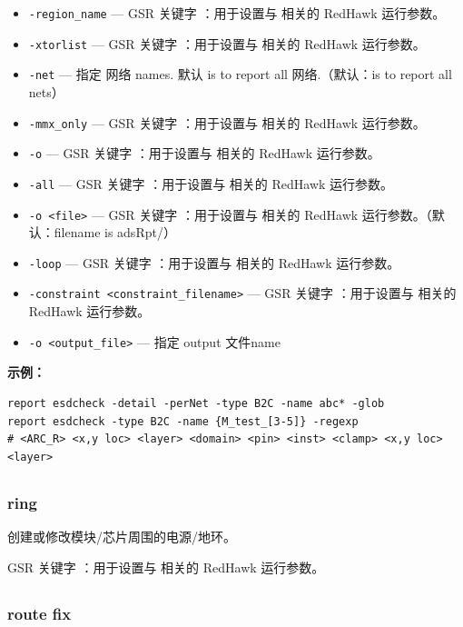 \begin{itemize}
\item \texttt{-region\_name} — GSR 关键字 ：用于设置与  相关的 RedHawk 运行参数。
\item \texttt{-xtorlist} — GSR 关键字 ：用于设置与  相关的 RedHawk 运行参数。
\item \texttt{-net} — 指定 网络 names. 默认 is to report all 网络.（默认：is to report all nets）
\item \texttt{-mmx\_only} — GSR 关键字 ：用于设置与  相关的 RedHawk 运行参数。
\item \texttt{-o} — GSR 关键字 ：用于设置与  相关的 RedHawk 运行参数。
\item \texttt{-all} — GSR 关键字 ：用于设置与  相关的 RedHawk 运行参数。
\item \texttt{-o <file>} — GSR 关键字 ：用于设置与  相关的 RedHawk 运行参数。（默认：filename is adsRpt/）
\item \texttt{-loop} — GSR 关键字 ：用于设置与  相关的 RedHawk 运行参数。
\item \texttt{-constraint <constraint\_filename>} — GSR 关键字 ：用于设置与  相关的 RedHawk 运行参数。
\item \texttt{-o <output\_file>} — 指定 output 文件name
\end{itemize}

\textbf{示例：}
\begin{lstlisting}
report esdcheck -detail -perNet -type B2C -name abc* -glob
report esdcheck -type B2C -name {M_test_[3-5]} -regexp
# <ARC_R> <x,y loc> <layer> <domain> <pin> <inst> <clamp> <x,y loc> <layer>
\end{lstlisting}

\subsection{}
\subsubsection*{ring}

创建或修改模块/芯片周围的电源/地环。

GSR 关键字 ：用于设置与  相关的 RedHawk 运行参数。

\subsection{}
\subsubsection*{route fix}

